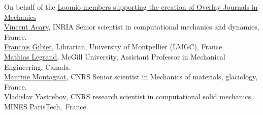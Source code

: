\documentclass[11pt]{article}
\begin{document}
On behalf of the \href{https://www.loomio.org/g/yPoIWNc5/for-an-epi-journal-in-mechanics}{Loomio members supporting the creation of Overlay Journals in Mechanics} \\[10pt]


\noindent\href{http://bipop.inrialpes.fr/people/acary}{Vincent Acary}, INRIA  Senior scientist in computational mechanics and dynamics, France. \\
\href{http://www.lmgc.univ-montp2.fr/spip.php?page=pageperso&nom=GIBIER&prenom=Francois}{Francois Gibier}, Librarian, University of Montpellier (LMGC), France \\
\href{http://www.mcgill.ca/mecheng/people/staff/mathias-legrand}{Mathias Legrand}, McGill University, Assistant Professor in Mechanical Engineering, Canada. \\
\href{http://www.ige-grenoble.fr/maurine-montagnat-rentier}{Maurine Montagnat}, CNRS  Senior scientist in Mechanics of materials, glaciology, France. \\
\href{http://www.yastrebov.fr}{Vladislav Yastrebov}, CNRS research scientist in computational solid mechanics, MINES ParisTech,~France. 
\end{document}
